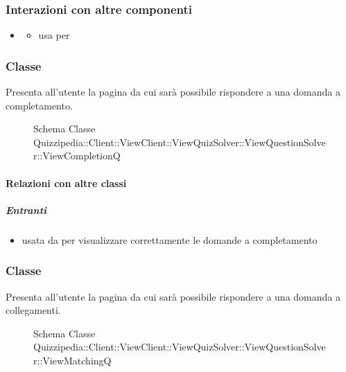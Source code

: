 \subsubsection{Interazioni con altre componenti}
\begin{itemize}
\item {}
\begin{itemize}
\item usa  per 
\end{itemize}
\end{itemize}
\subsubsection{Classe }
Presenta all'utente la pagina da cui sarà possibile rispondere a una domanda a completamento.
\begin{figure}[H]
\centering
\noindent{}
\caption[Schema Classe ViewCompletionQ]{Schema Classe Quizzipedia::Client::ViewClient::ViewQuizSolver::ViewQuestionSolver::ViewCompletionQ}
\end{figure}
\paragraph{Relazioni con altre classi}
\subparagraph{Entranti}
\begin{itemize}
\item usata da  per visualizzare correttamente le domande a completamento
\end{itemize}
\subsubsection{Classe }
Presenta all'utente la pagina da cui sarà possibile rispondere a una domanda a collegamenti.
\begin{figure}[H]
\centering
\noindent{}
\caption[Schema Classe ViewMatchingQ]{Schema Classe Quizzipedia::Client::ViewClient::ViewQuizSolver::ViewQuestionSolver::ViewMatchingQ}
\end{figure}

